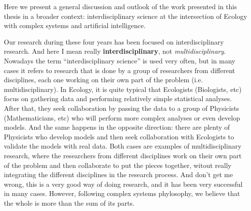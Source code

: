 
Here we present a general discussion and outlook of the work presented in this
thesis in a broader context: interdisciplinary science at the intersection of
Ecology with complex systems and artificial intelligence.


Our research during these four years has been focused on interdisciplinary
research. And here I mean really \textbf{interdisciplinary}, not
\textit{multidisciplinary}. Nowadays the term ``interdisciplinary science'' is
used very often, but in many cases it refers to research that is done by a
group of researchers from different disciplines, each one working on their own
part of the problem (i.e. multidisciplinary). In Ecology, it is quite typical
that Ecologists (Biologists, etc) focus on gathering data and performing
relatively simple statistical analyses. After that, they seek collaboration by
passing the data to a group of Physicists (Mathematicians, etc) who will
perform more complex analyses or even develop models. And the same happens in
the opposite direction: there are plenty of Physicists who develop models and
then seek collaboration with Ecologists to validate the models with real data.
Both cases are examples of multidisciplinary research, where the researchers
from different disciplines work on their own part of the problem and then
collaborate to put the pieces together, witout really integrating the different
disciplines in the research process. And don't get me wrong, this is a very
good way of doing research, and it has been very successful in many cases.
However, following complex systems phylosophy, we believe that the whole is
more than the sum of its parts.

